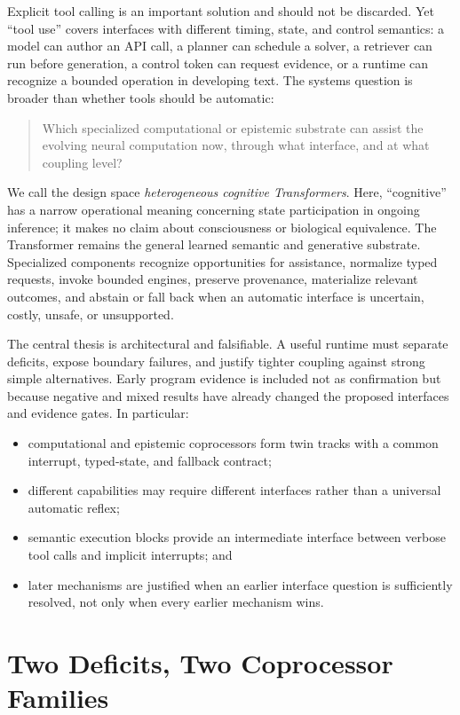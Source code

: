 \documentclass[11pt]{article}
\begin{document}
Explicit tool calling is an important solution and should not be discarded.
Yet ``tool use'' covers interfaces with different timing, state, and control
semantics: a model can author an API call, a planner can schedule a solver, a
retriever can run before generation, a control token can request evidence, or a
runtime can recognize a bounded operation in developing text.  The systems
question is broader than whether tools should be automatic:

\begin{quote}
Which specialized computational or epistemic substrate can assist the evolving
neural computation now, through what interface, and at what coupling level?
\end{quote}

We call the design space \emph{heterogeneous cognitive Transformers}.  Here,
``cognitive'' has a narrow operational meaning concerning state participation
in ongoing inference; it makes no claim about consciousness or biological
equivalence.  The Transformer remains the general learned semantic and
generative substrate.  Specialized components recognize opportunities for
assistance, normalize typed requests, invoke bounded engines, preserve
provenance, materialize relevant outcomes, and abstain or fall back when an
automatic interface is uncertain, costly, unsafe, or unsupported.

The central thesis is architectural and falsifiable.  A useful runtime must
separate deficits, expose boundary failures, and justify tighter coupling
against strong simple alternatives.  Early program evidence is included not as
confirmation but because negative and mixed results have already changed the
proposed interfaces and evidence gates.  In particular:
\begin{itemize}
  \item computational and epistemic coprocessors form twin tracks with a
  common interrupt, typed-state, and fallback contract;
  \item different capabilities may require different interfaces rather than a
  universal automatic reflex;
  \item semantic execution blocks provide an intermediate interface between
  verbose tool calls and implicit interrupts; and
  \item later mechanisms are justified when an earlier interface question is
  sufficiently resolved, not only when every earlier mechanism wins.
\end{itemize}

\section{Two Deficits, Two Coprocessor Families}
\end{document}
